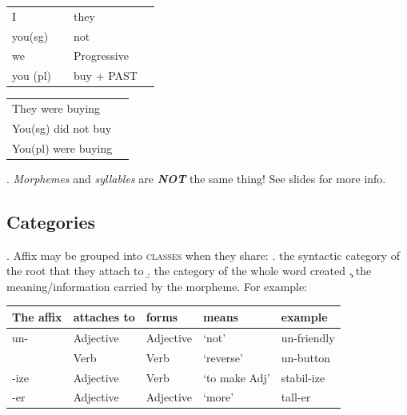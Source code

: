 \documentclass[11pt, oneside]{article}   	%
\begin{document}
\begin{tabular}{l l l l}
I 			& 	\underline{\hspace{1cm}}	&      	they 		&	\underline{\hspace{1cm}} \\	
you(sg) 	& 	\underline{\hspace{1cm}}				&		not  		&	\underline{\hspace{1cm}} \\
we			& 	\underline{\hspace{1cm}} 			&		Progressive &	\underline{\hspace{1cm}} \\
you (pl) 	&	\underline{\hspace{1cm}}				&		buy + PAST 	&	\underline{\hspace{1cm}} \\
\end{tabular}

\vspace{0.5cm}


\vspace{0.2cm}

\begin{tabular}{l l}
They were buying 	& 	\underline{\hspace{1cm}} \\
You(sg) did not buy &	\underline{\hspace{1cm}} \\
You(pl) were buying &	\underline{\hspace{1cm}} \\
\end{tabular}

\ex. {\itshape Morphemes} and {\itshape syllables} are {\itshape \bfseries NOT} the same thing! See slides for more info.

\subsection{Categories}

\ex. Affix may be grouped into {\scshape classes} when they share:
\a. the syntactic category of the root that they attach to
\b. the category of the whole word created
\c. the meaning/information carried by the morpheme. For example:

\begin{center}
\begin{tabular}{l l l l l} \hline
The affix & attaches to & forms & means & example \\ \hline
un- &	Adjective	&	Adjective	& `not' &	un-friendly \\ 
	&	Verb		&	Verb		& `reverse'	& un-button \\
-ize &	Adjective	&	Verb		& `to make Adj' & stabil-ize \\
-er	&	Adjective	&	Adjective	& `more'	&	tall-er \\
\end{tabular}
\end{center}
\end{document}
